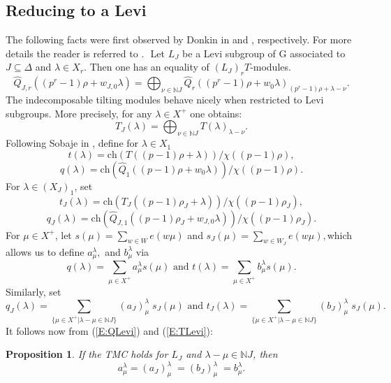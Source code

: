 \documentclass[twoside,11pt,reqno]{amsart}
\newcommand{\0}{\bar 0}
\newcommand{\1}{\bar 1}
\newcommand{\la}{\lambda}
\newcommand{\hQ}{\widehat{Q}}
\newtheorem{prop}{Proposition}[subsection]
\theoremstyle{definition}
\numberwithin{equation}{subsection}
\begin{document}
\subsection{Reducing to a Levi}
The following facts were first observed by Donkin   in \cite[Proposition 2.7]{Don93} and  \cite[Proposition 1.5 (ii)]{Don93}, respectively. For more details the reader is referred to \cite[Sections 2.5, 2.6]{BNPS22b}.
﻿
Let $L_J$ be a Levi subgroup of G associated to $J \subseteq \Delta$ and  $\la \in X_r.$ Then one has an equality of $(L_J)_rT$-modules.
﻿
\begin{equation}\label{E:QLevi}
\hQ_{J,r}((p^r-1)\rho + w_{J,0}\la) = \bigoplus_{\nu \in \mathbb{N}J} \widehat{Q}_r((p^r-1)\rho+w_0 \la)_{(p^r-1)\rho+\la-\nu}.
\end{equation}
The  indecomposable tilting modules behave nicely when restricted to Levi subgroups. More precisely,  for any $\la \in X^+$ one obtains:
\begin{equation}\label{E:TLevi}
T_J( \la)=\bigoplus_{\nu \in \mathbb{N}J} T( \la)_{\la-\nu}.
\end{equation} 
Following Sobaje in \cite{So20}, define for $\la \in X_1$
$$t(\la) =\text{ch} (T((p-1)\rho+\la))/\chi((p-1)\rho),$$
$$q(\la)= \text{ch} (\hQ_1((p-1)\rho+w_0 \la))/\chi((p-1)\rho).$$
For $\la \in (X_{J})_1$, set
$$t_J(\la) =\text{ch} (T_J((p-1)\rho_J+\la))/\chi((p-1)\rho_J),$$
$$q_J(\la)= \text{ch} (\hQ_{J,1}((p-1)\rho_J+w_{J,0} \la))/\chi((p-1)\rho_J).$$
For $\mu \in X^+$, let $s(\mu) = \sum_{w \in W}e(w\mu)$ and $s_J(\mu) = \sum_{w \in W_J}e(w\mu),$which allows us to define $a_{\mu}^{\la},$ and $b_{\mu}^{\la}$ via 
\begin{equation}
q(\la) = \sum_{\mu \in X^+} a_{\mu}^{\la} s(\mu) \text{ and } t(\la) = \sum_{\mu \in X^+} b_{\mu}^{\la} s(\mu).
\end{equation}
Similarly, set 
\begin{equation}
q_J(\la) = \sum_{\{\mu \in X^+ | \la-\mu \in \mathbb{N}J\}} (a_{J})_{\mu}^{\la} \;s_J(\mu) \text{ and } t_J(\la) = \sum_{\{\mu \in X^+ | \la-\mu \in \mathbb{N}J\}}  (b_{J})_{\mu}^{\la} \; s_J(\mu).
\end{equation}
It follows now from (\ref{E:QLevi}) and (\ref{E:TLevi}):
﻿
\begin{prop}\label{RedLevi}
If the TMC holds for $L_J$ and $\la - \mu \in \mathbb{N}J$, then
$$a_{\mu}^{\la}=(a_{J})_{\mu}^{\la} \;=(b_{J})_{\mu}^{\la} \;=b_{\mu}^{\la}.$$
\end{prop} 
﻿
﻿
\end{document}
